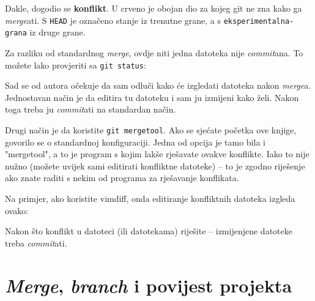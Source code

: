 
Dakle, dogodio se \textbf{konflikt}. 
U crveno je obojan dio za kojeg git ne zna kako ga \emph{merge}ati.
S \verb+HEAD+ je označeno stanje iz trenutne grane, a s \verb+eksperimentalna-grana+ iz druge grane.

Za razliku od standardnog \emph{merge}, ovdje niti jedna datoteka nije \emph{commit}ana. 
To možete lako provjeriti sa \verb+git status+:



Sad se od autora očekuje da sam odluči kako će izgledati datoteka nakon \emph{merge}a.
Jednostavan način je da editira tu datoteku i sam ju izmijeni kako želi.
Nakon toga treba ju \emph{commit}ati na standardan način.

Drugi način je da koristite \verb+git mergetool+.
Ako se sjećate početka ove knjige, govorilo se o standardnoj konfiguraciji. 
Jedna od opcija je tamo bila i "mergetool", a to je program s kojim lakše rješavate ovakve konflikte.
Iako to nije nužno (možete uvijek sami editirati konfliktne datoteke) -- to je zgodno riješenje ako znate raditi s nekim od programa za rješavanje konflikata.

Na primjer, ako koristite vimdiff, onda editiranje konfliktnih datoteka izgleda ovako:


Nakon što konflikt u datoteci (ili datotekama) riješite -- izmijenjene datoteke treba \emph{commit}ati.

\section*{\emph{Merge}, \emph{branch} i povijest projekta}

